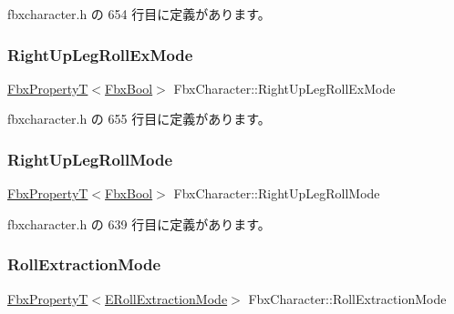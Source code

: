  fbxcharacter.\+h の 654 行目に定義があります。

\mbox{\label{class_fbx_character_a30dcd9180563bd919e35f7175cbce100}} 
\subsubsection{\texorpdfstring{Right\+Up\+Leg\+Roll\+Ex\+Mode}{RightUpLegRollExMode}}
{\footnotesize\ttfamily \hyperlink{class_fbx_property_t}{Fbx\+PropertyT}$<$\hyperlink{fbxtypes_8h_a92e0562b2fe33e76a242f498b362262e}{Fbx\+Bool}$>$ Fbx\+Character\+::\+Right\+Up\+Leg\+Roll\+Ex\+Mode}



 fbxcharacter.\+h の 655 行目に定義があります。

\mbox{\label{class_fbx_character_a29251f940985b5d6f9cd0b972ecf7070}} 
\subsubsection{\texorpdfstring{Right\+Up\+Leg\+Roll\+Mode}{RightUpLegRollMode}}
{\footnotesize\ttfamily \hyperlink{class_fbx_property_t}{Fbx\+PropertyT}$<$\hyperlink{fbxtypes_8h_a92e0562b2fe33e76a242f498b362262e}{Fbx\+Bool}$>$ Fbx\+Character\+::\+Right\+Up\+Leg\+Roll\+Mode}



 fbxcharacter.\+h の 639 行目に定義があります。

\mbox{\label{class_fbx_character_aabd9d78eb10d7a77fe7902fc94a19cb6}} 
\subsubsection{\texorpdfstring{Roll\+Extraction\+Mode}{RollExtractionMode}}
{\footnotesize\ttfamily \hyperlink{class_fbx_property_t}{Fbx\+PropertyT}$<$\hyperlink{class_fbx_character_af25b0a8483d9c3da279a60dd3a9a388e}{E\+Roll\+Extraction\+Mode}$>$ Fbx\+Character\+::\+Roll\+Extraction\+Mode}



